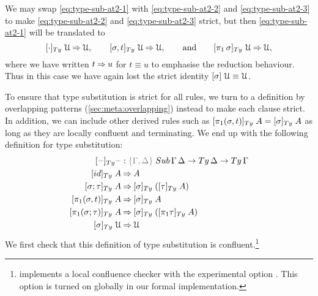 \documentclass[a4paper,UKenglish,numberwithinsect,cleveref,thm-restate]{lipics-v2021}
\begin{document}
We may swap \eqref{eq:type-sub-at2-1} with \eqref{eq:type-sub-at2-2} and \eqref{eq:type-sub-at2-3} to make \eqref{eq:type-sub-at2-2} and \eqref{eq:type-sub-at2-3} strict, but then \eqref{eq:type-sub-at2-1} will be translated to 
\[
[ \emptysub ]_{\Ty}\;\UU         \reduce \UU, \qquad
[ \sigma, t ]_{\Ty}\;\UU         \reduce \UU, \qquad\text{and}\qquad 
[ \pi_1\,\sigma ]_{\Ty}\;\UU     \reduce \UU,
\]
where we have written $t \mathbin{\Rightarrow} u$ for $t \equiv u$ to emphasise the reduction behaviour. Thus in this case we have again lost the strict identity $[\sigma]\;\mathcal{U} \equiv \mathcal{U}$.
%

To ensure that type substitution is strict for all %
{rules}, we turn to a definition by overlapping patterns (\cref{sec:meta:overlapping}) instead to make each clause strict. 
In addition, we can include other derived rules such as $[\pi_1(\sigma, t)]_{\Ty}\;A = [ \sigma]_{\Ty}\;A$ as long as they are locally confluent and terminating.
We end up with the following definition for type substitution:
\begin{alignat}{3}
[\blank]_{\Ty} \blank            &: \implicit{\Gamma, \Delta} \; \Sub\,\Gamma\,\Delta \to \Ty\,\Delta \to \Ty\,\Gamma \nonumber \\
[ \idS ]_{\Ty}\;A                & \reduce A \label{eq:def-type-subst-1}\\
[ \sigma ; \tau ]_{\Ty}\;A       & \reduce [ \sigma ]_{\Ty}\;([ \tau ]_{\Ty}\;A) \label{eq:def-type-subst-2}\\
[ \pi_1(\sigma, t) ]_{\Ty}\;A    & \reduce [\sigma]_\Ty\;A                       \label{eq:def-type-subst-3} \\
[ \pi_1(\sigma; \tau) ]_{\Ty}\;A & \reduce [\sigma]_\Ty\;([\pi_1\tau]_\Ty\;A)    \label{eq:def-type-subst-4} \\
[ \sigma ]_{\Ty}\;\UU            & \reduce \UU                                   \label{eq:def-type-subst-5}
\end{alignat}
We first check that this definition of type substitution is confluent.\footnote{%
\Agda implements a local confluence checker with the experimental option .
This option is turned on globally in our formal implementation.}
\end{document}

